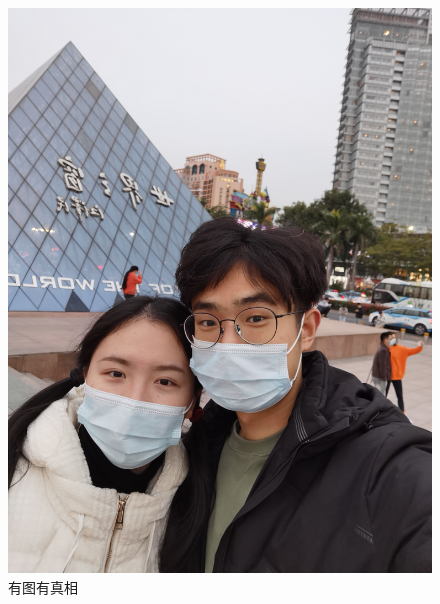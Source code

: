 \documentclass[UTF8]{ctexart}
\begin{document}
\begin{figure}[htbp]
\centering
\includegraphics[width=.8\textwidth]{img/a.jpg}
\caption{有图有真相}
\label{fig:myphoto}
\end{figure}
\end{document}
